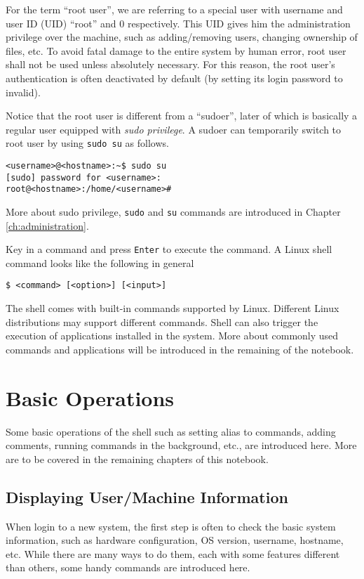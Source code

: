 For the term ``root user'', we are referring to a special user with username and user ID (UID) ``root'' and 0 respectively. This UID gives him the administration privilege over the machine, such as adding/removing users, changing ownership of files, etc. To avoid fatal damage to the entire system by human error, root user shall not be used unless absolutely necessary. For this reason, the root user's authentication is often deactivated by default (by setting its login password to invalid).

Notice that the root user is different from a ``sudoer'', later of which is basically a regular user equipped with \textit{sudo privilege}. A sudoer can temporarily switch to root user by using \verb|sudo su| as follows.
\begin{lstlisting}
<username>@<hostname>:~$ sudo su
[sudo] password for <username>:
root@<hostname>:/home/<username>#
\end{lstlisting}
More about sudo privilege, \verb|sudo| and \verb|su| commands are introduced in Chapter \ref{ch:administration}.

Key in a command and press \verb|Enter| to execute the command. A Linux shell command looks like the following in general
\begin{lstlisting}
$ <command> [<option>] [<input>]
\end{lstlisting}

The shell comes with built-in commands supported by Linux. Different Linux distributions may support different commands. Shell can also trigger the execution of applications installed in the system. More about commonly used commands and applications will be introduced in the remaining of the notebook.

\section{Basic Operations}

Some basic operations of the shell such as setting alias to commands, adding comments, running commands in the background, etc., are introduced here. More are to be covered in the remaining chapters of this notebook.

\subsection{Displaying User/Machine Information}

When login to a new system, the first step is often to check the basic system information, such as hardware configuration, OS version, username, hostname, etc. While there are many ways to do them, each with some features different than others, some handy commands are introduced here.

